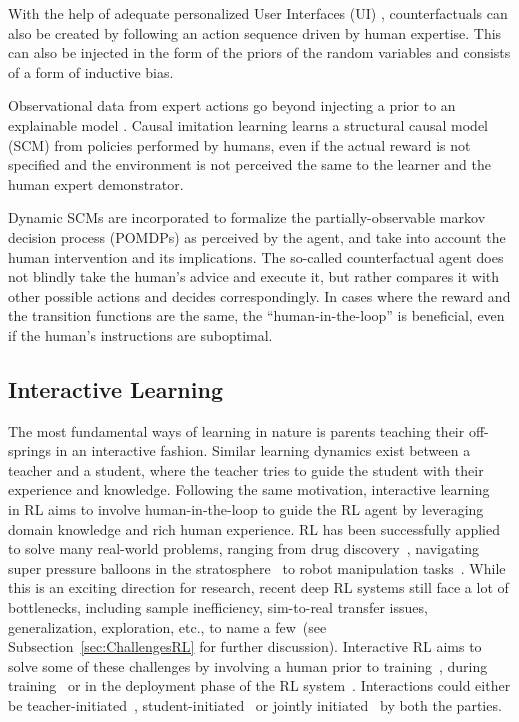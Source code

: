 \documentclass[twoside,11pt]{article}
\begin{document}
\begin{enumerate}
With the help of adequate personalized User Interfaces (UI) \citep{Sun:2021:TopologyPerturbationGNNs}, counterfactuals can also be created by following an action sequence driven by human expertise. This can also be injected in the form of the priors of the random variables and consists of a form of inductive bias.

Observational data from expert actions go beyond injecting a prior to an explainable model \citep{Zhang:2020:CausalImitationLearning}. Causal imitation learning learns a structural causal model (SCM) \citep{Pearl:2000:ModelsReasoningInference} from policies performed by humans, even if the actual reward is not specified and the environment is not perceived the same to the learner and the human expert demonstrator. 

Dynamic SCMs are incorporated to formalize the partially-observable markov decision process (POMDPs) \citep{SuttonBarto:2018:RLIntroduction} as perceived by the agent, and take into account the human intervention and its implications. The so-called counterfactual agent does not blindly take the human's advice and execute it, but rather compares it with other possible actions and decides correspondingly. In cases where the reward and the transition functions are the same, the ``human-in-the-loop'' is beneficial, even if the human's instructions are suboptimal.

\subsection{Interactive Learning}
\label{sec:InteractiveLearning}
    
The most fundamental ways of learning in nature is parents teaching their off-springs in an interactive fashion. Similar learning dynamics exist between a teacher and a student, where the teacher tries to guide the student with their experience and knowledge. Following the same motivation, interactive learning~\citep{Arzate:2020:SurveyInteractiveRL} in RL aims to involve human-in-the-loop to guide the RL agent by leveraging domain knowledge and rich human experience. RL has been successfully applied to solve many real-world problems, ranging from drug discovery~\citep{popova2018deep}, navigating super pressure balloons in the stratosphere~\citep{bellemare2020autonomous} to robot manipulation tasks~\citep{nguyen2019review}. While this is an exciting direction for research, recent deep RL systems still face a lot of bottlenecks, including sample inefficiency, sim-to-real transfer issues, generalization, exploration, etc., to name a few~(see Subsection~\ref{sec:ChallengesRL} for further discussion)\citep{ibarz2021train}. Interactive RL aims to solve some of these challenges by involving a human prior to training~\citep{Guo:2022:RLSurveyHumanPriorKnowledge}, during training~\citep{Knox:2008:TAMER} or in the deployment phase of the RL system~\citep{guo2021edge}. Interactions could either be teacher-initiated~\citep{torrey2013teaching}, student-initiated~\citep{da2020uncertainty,MandelEtAl:2017ActionsInHITL} or jointly initiated~\citep{amir2016interactive} by both the parties.


\end{enumerate}
\end{document}
